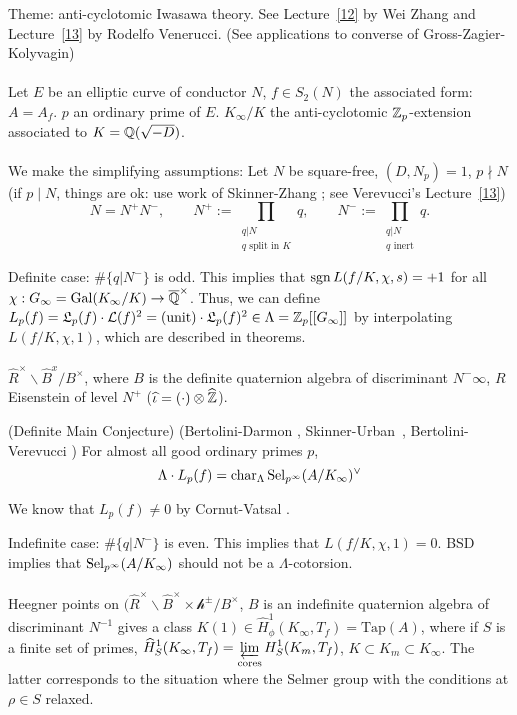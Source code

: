 \documentclass[12pt,amsfont]{amsart}
\begin{document}
Theme: anti-cyclotomic Iwasawa theory. See Lecture~\ref{12} by Wei Zhang and Lecture~\ref{13} by Rodelfo Venerucci. (See applications to converse of Gross-Zagier-Kolyvagin) \\ \\
Let $E$ be an elliptic curve of conductor $N$, $f \in S_2(N)$ the associated form: $A = A_f$. $p$ an ordinary prime of $E$. $K_\infty/K$ the anti-cyclotomic ${\mathbb Z}_p$-extension associated to $K = {\mathbb Q}(\sqrt{-D})$. \\ \\
We make the simplifying assumptions: Let $N$ be square-free, $(D, N_p) = 1$, $p \nmid N$ (if $p \mid N$, things are ok: use work of Skinner-Zhang ; see Verevucci's Lecture~\ref{13})
\[N  = N^+ N^{-}, \qquad N^+ := \prod_{\substack{q | N \\ q \text{ split in } K}} q,\qquad N^{-} := \prod_{\substack{q | N \\ q \text{ inert}}} q.\]

Definite case: $\# \{q | N^{-}\}$ is odd. This implies that $\operatorname{sgn} L(f/K, \chi, s) = +1$ for all $\chi : G_\infty = \operatorname{Gal}(K_\infty/K) \rightarrow \overline{{\mathbb Q}}^\times$. Thus, we can define $L_p(f) = \mathfrak{L}_p(f) \cdot \mathcal{L}(f)^2 = (\text{unit}) \cdot \mathfrak{L}_p(f)^2 \in \Lambda = {\mathbb Z}_p[[G_\infty]]$ by interpolating $L(f/K, \chi, 1)$, which are described in theorems. \\ \\
$\widehat{R}^\times \backslash \widehat{B}^x / B^\times$, where $B$ is the definite quaternion algebra of discriminant $N^{-} \infty$, $R$ Eisenstein of level $N^+$ ($\widehat{\iota} = (\cdot) \otimes \widehat{{\mathbb Z}}$). 

\begin{thm} (Definite Main Conjecture) (Bertolini-Darmon , Skinner-Urban~, Bertolini-Verevucci ) For almost all good ordinary primes $p$, 
\[\Lambda \cdot L_p(f) = \operatorname{char}_{\Lambda} \operatorname{Sel}_{p^\infty}(A / K_\infty)^\vee \]
\end{thm}

\begin{rmk} We know that $L_p(f) \ne 0$ by Cornut-Vatsal . \end{rmk}

Indefinite case: $\# \{q | N^{-}\}$ is even. This implies that $L(f/K, \chi, 1) = 0$. BSD implies that $\operatorname{Sel}_{p^\infty} (A/K_\infty)$ should not be a $\Lambda$-cotorsion. \\ \\
Heegner points on $(\widehat{R}^\times \backslash \widehat{B}^\times \times \mathcal{h}^{\pm}/B^\times$, $B$ is an indefinite quaternion algebra of discriminant $N^{-1}$ gives a class $K(1) \in \widehat{H}_\phi^1(K_\infty, T_f) = \text{Tap}(A)$, where if $S$ is a finite set of primes, $\displaystyle \widehat{H}_S^1(K_\infty, T_f) = \varprojlim\limits_{\text{cores}} H_S^1(K_m, T_f)$, $K \subset K_m \subset K_\infty$. The latter corresponds to the situation where the Selmer group with the conditions at $\rho \in S$ relaxed. 
\end{document}
